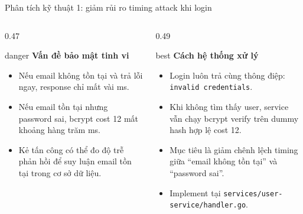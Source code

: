 \documentclass[aspectratio=169]{beamer}
\begin{document}
\begin{frame}[shrink=5]{Phân tích kỹ thuật 1: giảm rủi ro timing attack khi login}
    \begin{columns}[T,onlytextwidth]
        \begin{column}{0.47\textwidth}
            \begin{claimbox}{danger}
                \textbf{Vấn đề bảo mật tinh vi}
                \begin{itemize}\small
                    \item Nếu email không tồn tại và trả lỗi ngay, response chỉ mất vài ms.
                    \item Nếu email tồn tại nhưng password sai, bcrypt cost 12 mất khoảng hàng trăm ms.
                    \item Kẻ tấn công có thể đo độ trễ phản hồi để suy luận email tồn tại trong cơ sở dữ liệu.
                \end{itemize}
            \end{claimbox}
        \end{column}
        \begin{column}{0.49\textwidth}
            \begin{claimbox}{best}
                \textbf{Cách hệ thống xử lý}
                \begin{itemize}\small
                    \item Login luôn trả cùng thông điệp: \texttt{invalid credentials}.
                    \item Khi không tìm thấy user, service vẫn chạy bcrypt verify trên dummy hash hợp lệ cost 12.
                    \item Mục tiêu là giảm chênh lệch timing giữa ``email không tồn tại'' và ``password sai''.
                    \item Implement tại \texttt{services/user-service/handler.go}.
                \end{itemize}
            \end{claimbox}
        \end{column}
    \end{columns}
\end{frame}
\end{document}

